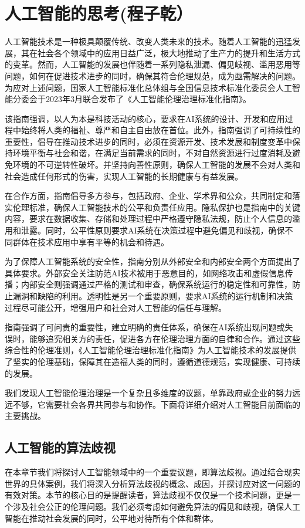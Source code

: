 \chapter{人工智能的思考(程子乾）}
人工智能技术是一种极具颠覆传统、改变人类未来的技术。随着人工智能的迅猛发展，其在社会各个领域中的应用日益广泛，极大地推动了生产力的提升和生活方式的变革。然而，人工智能的发展也伴随着一系列隐私泄漏、偏见岐视、滥用恶用等问题，如何在促进技术进步的同时，确保其符合伦理规范，成为亟需解决的问题。
为应对上述问题，国家人工智能标准化总体组与全国信息技术标准化委员会人工智能分委会于2023年3月联合发布了《人工智能伦理治理标准化指南》。

该指南强调，以人为本是科技活动的核心，要求在AI系统的设计、开发和应用过程中始终将人类的福祉、尊严和自主自由放在首位。此外，指南强调了可持续性的重要性，倡导在推动技术进步的同时，必须在资源开发、技术发展和制度变革中保持环境平衡与社会和谐，在满足当前需求的同时，不对自然资源进行过度消耗及避免环境的不可逆转性破坏。并坚持向善性原则，确保人工智能的发展不会对人类和社会造成任何形式的伤害，实现人工智能的长期健康与有益发展。

在合作方面，指南倡导多方参与，包括政府、企业、学术界和公众，共同制定和落实伦理标准，确保人工智能技术的公平和负责任应用。隐私保护也是指南中的关键内容，要求在数据收集、存储和处理过程中严格遵守隐私法规，防止个人信息的滥用和泄露。同时，公平性原则要求AI系统在决策过程中避免偏见和歧视，确保不同群体在技术应用中享有平等的机会和待遇。

为了保障人工智能系统的安全性，指南分别从外部安全和内部安全两个方面提出了具体要求。外部安全关注防范AI技术被用于恶意目的，如网络攻击和虚假信息传播；内部安全则强调通过严格的测试和审查，确保系统运行的稳定性和可靠性，防止漏洞和缺陷的利用。透明性是另一个重要原则，要求AI系统的运行机制和决策过程尽可能公开，增强用户和社会对人工智能的信任与理解。

指南强调了可问责的重要性，建立明确的责任体系，确保在AI系统出现问题或失误时，能够追究相关方的责任，促进各方在伦理治理方面的自律和合作。通过这些综合性的伦理准则，《人工智能伦理治理标准化指南》为人工智能技术的发展提供了坚实的伦理基础，保障其在造福人类的同时，遵循道德规范，实现健康、可持续的发展。

我们发现人工智能伦理治理是一个复杂且多维度的议题，单靠政府或企业的努力远远不够，它需要社会各界共同参与和协作。下面将详细介绍对人工智能目前面临的主要挑战。



\section{人工智能的算法歧视}
在本章节我们将探讨人工智能领域中的一个重要议题，即算法歧视。通过结合现实世界的具体案例，我们将深入分析算法歧视的概念、成因，并探讨应对这一问题的有效对策。本节的核心目的是提醒读者，算法歧视不仅仅是一个技术问题，更是一个涉及社会公正的伦理问题。我们必须考虑如何避免算法的偏见和歧视，确保人工智能在推动社会发展的同时，公平地对待所有个体和群体。
